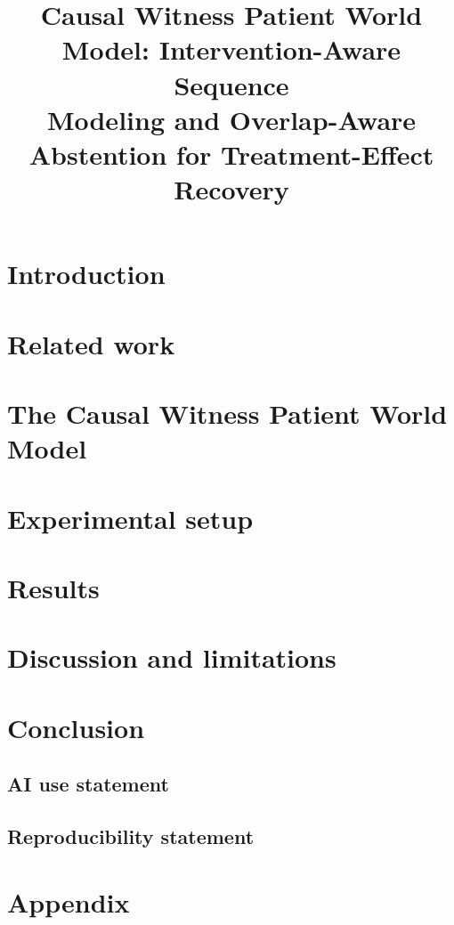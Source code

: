 \documentclass{article} %
\title{Causal Witness Patient World Model: Intervention-Aware Sequence \\
Modeling and Overlap-Aware Abstention for Treatment-Effect Recovery}
\begin{document}
\maketitle

\begin{abstract}

\end{abstract}

\section{Introduction}
\label{sec:introduction}


\section{Related work}
\label{sec:related_work}


\section{The Causal Witness Patient World Model}
\label{sec:method}


\section{Experimental setup}
\label{sec:experimental_setup}


\section{Results}
\label{sec:results}


\section{Discussion and limitations}
\label{sec:discussion}


\section{Conclusion}
\label{sec:conclusion}


\subsection*{AI use statement}


\subsection*{Reproducibility statement}





\appendix
\section{Appendix}

\end{document}
